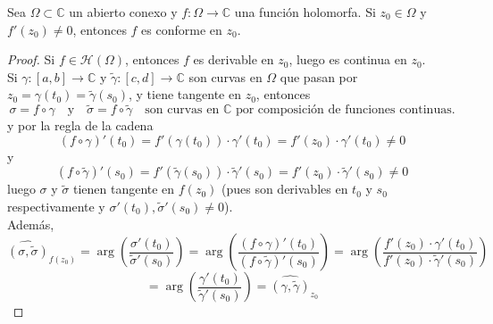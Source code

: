 \begin{proposición}
    Sea $\Omega \subset \mathbb{C}$ un abierto conexo y $f : \Omega \to \mathbb{C}$ una función holomorfa. 
    Si $z_0 \in \Omega$ y $f'(z_0) \neq 0$, entonces $f$ es conforme en $z_0$.    
\end{proposición}

\begin{proof}
    Si $f \in \mathcal{H}(\Omega)$, entonces $f$ es derivable en $z_0$, luego es continua en $z_0$.\\
    Si $\gamma : [a,b] \to \mathbb{C}$ y $\tilde{\gamma} : [c,d] \to \mathbb{C}$ son curvas en $\Omega$ que pasan por $z_0 = \gamma(t_0) = \tilde{\gamma}(s_0)$, y tiene tangente en $z_0$, entonces
    \[
        \sigma = f \circ \gamma \quad \text{y} \quad \tilde{\sigma} = f \circ \tilde{\gamma} \quad \text{son curvas en } \mathbb{C} \text{ por composición de funciones continuas.}
    \]
    y por la regla de la cadena
    \[
        (f \circ \gamma)'(t_0) = f'(\gamma(t_0)) \cdot \gamma'(t_0) = f'(z_0) \cdot \gamma'(t_0) \neq 0
    \]
    y
    \[
        (f \circ \tilde{\gamma})'(s_0) = f'(\tilde{\gamma}(s_0)) \cdot \tilde{\gamma}'(s_0) = f'(z_0) \cdot \tilde{\gamma}'(s_0) \neq 0
    \]
    luego $\sigma$ y $\tilde{\sigma}$ tienen tangente en $f(z_0)$ (pues son derivables en $t_0$ y $s_0$ respectivamente y $\sigma'(t_0), \tilde{\sigma}'(s_0) \neq 0$).\\
    Además,
    \[
        \widehat{(\sigma, \tilde{\sigma})}_{f(z_0)} = \arg\left(\frac{\sigma'(t_0)}{\tilde{\sigma}'(s_0)}\right) = \arg\left(\frac{(f \circ \gamma)'(t_0)}{(f \circ \tilde{\gamma})'(s_0)}\right) = \arg\left(\frac{f'(z_0) \cdot \gamma'(t_0)}{f'(z_0) \cdot \tilde{\gamma}'(s_0)}\right)
    \]
    \[
        = \arg\left(\frac{\gamma'(t_0)}{\tilde{\gamma}'(s_0)}\right) = \widehat{(\gamma, \tilde{\gamma})}_{z_0}
    \]
\end{proof}



